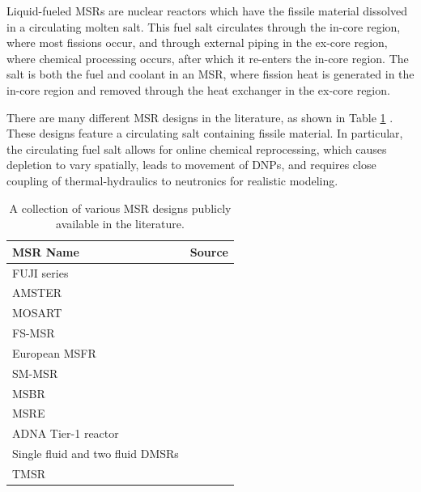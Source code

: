 Liquid-fueled \glspl{MSR} are nuclear reactors which have the fissile material dissolved in a circulating molten salt. 
This fuel salt circulates through the in-core region, where most fissions occur, and through external piping in the ex-core region, where chemical processing occurs, after which it re-enters the in-core region.
The salt is both the fuel and coolant in an \gls{MSR}, where fission heat is generated in the in-core region and removed through the heat exchanger in the ex-core region.

There are many different \gls{MSR} designs in the literature, as shown in Table \ref{tab:msr-designs} \cite{cheng2014development}.
These designs feature a circulating salt containing fissile material.
In particular, the circulating fuel salt allows for online chemical reprocessing, which causes depletion to vary spatially, leads to movement of \glspl{DNP}, and requires close coupling of thermal-hydraulics to neutronics for realistic modeling.

\begin{table}[H]
    \caption{A collection of various \gls{MSR} designs publicly available in the literature.}
    \centering
    \begin{tabular}{lc}
    \hline
       \gls{MSR} Name  & Source \\
       \hline
       FUJI series  & \cite{furukawa1990thorium}\\
       \Gls{AMSTER} & \cite{vergnes2002amster}\\
       \Gls{MOSART} & \cite{ignatiev2007progress}\\
       \Gls{FS-MSR} & \cite{holcomb2011fast}\\
       European \Gls{MSFR} & \cite{merle2008introduction}\\
       \Gls{SM-MSR} & \cite{casino2007small}\\
       \Gls{MSBR} & \cite{robertson_conceptual_1971}\\
       \Gls{MSRE} & \cite{robertson1965msre}\\
       \Gls{ADNA} Tier-1 reactor & \cite{bowman2000once}\\
       Single fluid and two fluid \glspl{DMSR} & \cite{engel1980conceptual, ahmad_neutronics_2015}\\
       \Gls{TMSR} & \cite{nuttin2005potential, merle-lucotte_thorium_2007}\\
       \hline
    \end{tabular}
    \label{tab:msr-designs}
\end{table}



